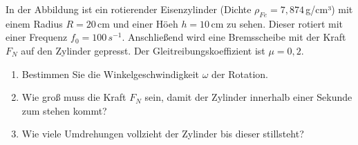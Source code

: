 \begin{ExerciseBlock}
In der Abbildung ist ein rotierender Eisenzylinder (Dichte $\rho_{Fe} = 7,874\,$g/cm³) mit einem Radius $R=20\,$cm und einer Höeh $h=10\,$cm zu sehen. Dieser rotiert mit einer Frequenz $f_0=100\,s^{-1}$. Anschließend wird eine Bremsscheibe mit der Kraft $F_N$ auf den Zylinder gepresst. Der Gleitreibungskoeffizient ist $\mu=0,2$.

\begin{enumerate}
	\item Bestimmen Sie die Winkelgeschwindigkeit $\omega$ der Rotation.
	\item Wie groß muss die Kraft $F_N$ sein, damit der Zylinder innerhalb einer Sekunde zum stehen kommt?
	\item Wie viele Umdrehungen vollzieht der Zylinder bis dieser stillsteht?
\end{enumerate}

\begin{center}
\end{center}
\end{ExerciseBlock}
